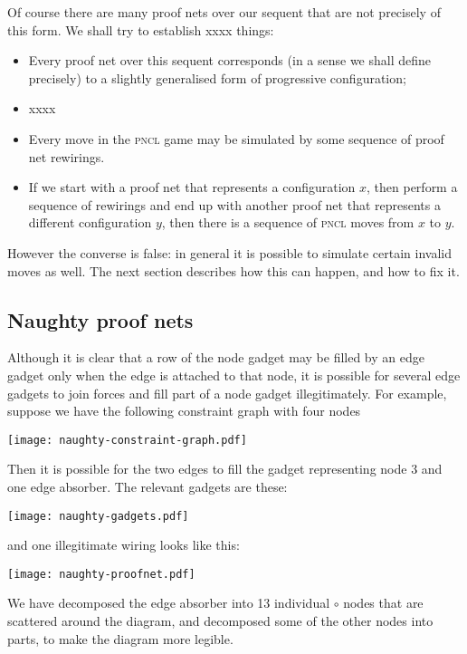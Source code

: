 \documentclass{robinminion}
\begin{document}
\noindent Of course there are many proof nets over our sequent that are not precisely of this form. We shall try to establish xxxx things:
\begin{itemize}
	\item Every proof net over this sequent corresponds (in a sense we shall define precisely) to a slightly generalised form of progressive configuration;
	\item xxxx
	\item Every move in the \textsc{pncl} game may be simulated by some sequence of proof net rewirings.
	\item If we start with a proof net that represents a configuration $x$, then perform a sequence of rewirings and end up with another proof net that represents a different configuration $y$, then there is a sequence of \textsc{pncl} moves from $x$ to $y$.
\end{itemize}

However the converse is false: in general it is possible to simulate certain invalid moves as well. The next section describes how this can happen, and how to fix it.


\subsection*{Naughty proof nets}

\noindent Although it is clear that a row of the node gadget may be filled by an edge gadget only when the edge is attached to that node, it is possible for several edge gadgets to join forces and fill part of a node gadget illegitimately. For example, suppose we have the following constraint graph with four nodes
\begin{center}\texttt{[image: naughty-constraint-graph.pdf]}\end{center}
Then it is possible for the two edges to fill the gadget representing node 3 and one edge absorber. The relevant gadgets are these:
\begin{center}\texttt{[image: naughty-gadgets.pdf]}\end{center}
and one illegitimate wiring looks like this:
\begin{center}\texttt{[image: naughty-proofnet.pdf]}\end{center}
We have decomposed the edge absorber into 13 individual $\circ$ nodes that are scattered around the diagram, and decomposed some of the other nodes into parts, to make the diagram more legible.
\end{document}
